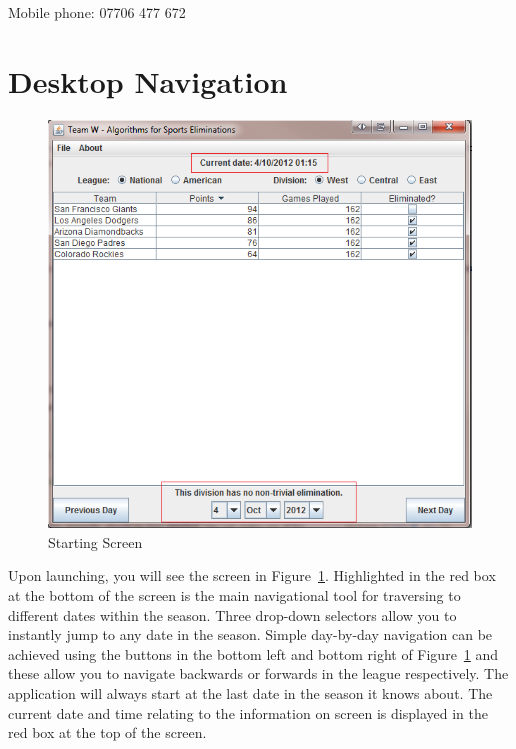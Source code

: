 Mobile phone: 07706 477 672

\section{Desktop Navigation}

\begin{figure}
  \includegraphics[width=\linewidth,keepaspectratio]{images/userManualDesk1.png}
  \caption{Starting Screen}\label{fig:STARTSCREEN}
\end{figure}
Upon launching, you will see the screen in Figure~\ref{fig:STARTSCREEN}.
Highlighted in the red box at the bottom of the screen is the
main navigational tool for traversing to different dates within the
season. Three drop-down selectors allow you to instantly jump to any
date in the season. Simple day-by-day navigation can be achieved
using the buttons in the bottom left and bottom right of
Figure~\ref{fig:STARTSCREEN} and these allow you to navigate backwards
or forwards in the league respectively.
The application will always start at the last date in the season it
knows about. The current date and time relating to the information on
screen is displayed in the red box at the top of the screen.

